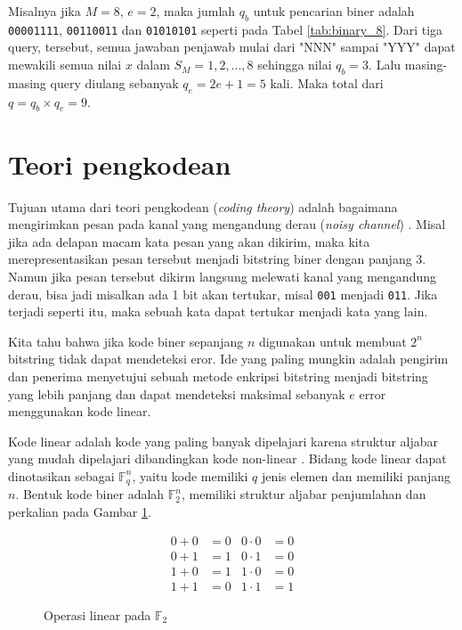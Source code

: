 Misalnya jika $M=8$, $e=2$, maka jumlah $q_b$ untuk pencarian biner adalah \texttt{00001111}, \texttt{00110011} dan \texttt{01010101} seperti pada Tabel \ref{tab:binary_8}. Dari tiga query, tersebut, semua jawaban penjawab mulai dari "NNN" sampai "YYY" dapat mewakili semua nilai $x$ dalam $S_M={1,2,...,8}$ sehingga nilai $q_b=3$. Lalu masing-masing query diulang sebanyak $q_e=2e+1=5$ kali. Maka total dari $q=q_b \times q_e=9$.


\section{Teori pengkodean}

Tujuan utama dari teori pengkodean (\textit{coding theory}) adalah bagaimana mengirimkan pesan pada kanal yang mengandung derau (\textit{noisy channel}) \cite{VanLint2016}. Misal jika ada delapan macam kata pesan yang akan dikirim, maka kita merepresentasikan pesan tersebut menjadi bitstring biner dengan panjang 3. Namun jika pesan tersebut dikirm langsung melewati kanal yang mengandung derau, bisa jadi misalkan ada 1 bit akan tertukar, misal \texttt{001} menjadi \texttt{011}. Jika terjadi seperti itu, maka sebuah kata dapat tertukar menjadi kata yang lain.

Kita tahu bahwa jika kode biner sepanjang $n$ digunakan untuk membuat $2^n$ bitstring tidak dapat mendeteksi eror. Ide yang paling mungkin adalah pengirim dan penerima menyetujui sebuah metode enkripsi bitstring menjadi bitstring yang lebih panjang dan dapat mendeteksi maksimal sebanyak $e$ error menggunakan kode linear.

Kode linear adalah kode yang paling banyak dipelajari karena struktur aljabar yang mudah dipelajari dibandingkan kode non-linear \cite{Huffman}. Bidang kode linear dapat dinotasikan sebagai $\mathbb{F}_q^n$, yaitu kode memiliki $q$ jenis elemen dan memiliki panjang $n$. Bentuk kode biner adalah $\mathbb{F}_2^n$, memiliki struktur aljabar penjumlahan dan perkalian pada Gambar \ref{fig:algebra}.

\begin{figure}
\centering
\begin{align*}
0 + 0 &= 0 & 0 \cdot 0 &= 0 \\
0 + 1 &= 1 & 0 \cdot 1 &= 0 \\
1 + 0 &= 1 & 1 \cdot 0 &= 0 \\
1 + 1 &= 0 & 1 \cdot 1 &= 1
\end{align*}
\caption{Operasi linear pada $\mathbb{F}_2$}
\label{fig:algebra}
\end{figure}

